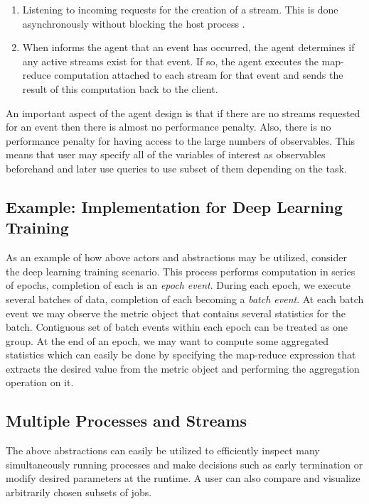 \documentclass[sigchi]{acmart}
\begin{document}
\begin{enumerate}
  \item Listening to incoming requests for the creation of a stream. This is done asynchronously without blocking the host process .
  \item When  informs the agent that an event has occurred, the agent determines if any active streams exist for that event. If so, the agent executes the map-reduce computation attached to each stream for that event and sends the result of this computation back to the client.
\end{enumerate}

An important aspect of the agent design is that if there are no streams requested for an event then there is almost no performance penalty. Also, there is no performance penalty for having access to the large numbers of observables. This means that user may specify all of the variables of interest as observables beforehand and later use queries to use subset of them depending on the task.

\subsection{Example: Implementation for Deep Learning Training}

As an example of how above actors and abstractions may be utilized, consider the deep learning training scenario. This process performs computation in series of epochs, completion of each is an \emph{epoch event}. During each epoch, we execute several batches of data, completion of each becoming a \emph{batch event}. At each batch event we may observe the metric object that contains several statistics for the batch. Contiguous set of batch events within each epoch can be treated as one group. At the end of an epoch, we may want to compute some aggregated statistics which can easily be done by specifying the map-reduce expression that extracts the desired value from the metric object and performing the aggregation operation on it.

\subsection{Multiple Processes and Streams}
The above abstractions can easily be utilized to efficiently inspect many simultaneously running processes and make decisions such as early termination or modify desired parameters at the runtime. A user can also compare and visualize arbitrarily chosen subsets of jobs. 
\end{document}
